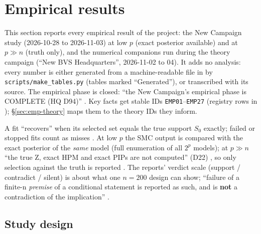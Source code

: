 \section{Empirical results}\label{sec:empirics}

This section reports every empirical result of the project: the New Campaign study (2026-10-28 to 2026-11-03) at
low $p$ (exact posterior available) and at $p\gg n$ (truth only), and the numerical companions run during the theory
campaign (``New BVS Headquarters'', 2026-11-02 to 04). It adds no analysis: every number is either generated from a
machine-readable file in  by \texttt{scripts/make\_tables.py} (tables marked ``Generated''), or
transcribed with its source. The empirical phase is closed: ``the New Campaign's empirical phase is COMPLETE (HQ D94)''
. Key facts get stable IDs \texttt{EMP01}--\texttt{EMP27} (registry rows in
); \S\ref{sec:emp-theory} maps them to the theory IDs they inform.

\begin{plain}
A fit ``recovers'' when its selected set equals the true support $S_0$ exactly; failed or stopped fits count as
misses . At low $p$ the SMC output is compared with
the exact posterior of the \emph{same} model (full enumeration of all $2^p$ models); at $p\gg n$ ``the true Z, exact HPM
and exact PIPs are not computed'' (D22) , so only selection against the truth is reported
. The reports' verdict scale (support / contradict /
silent) is about what one $n=200$ design can show; ``failure of a finite-n \emph{premise} of a conditional statement is
reported as such, and is \textbf{not} a contradiction of the implication''
.
\end{plain}

\subsection{Study design}\label{sec:emp-design}

